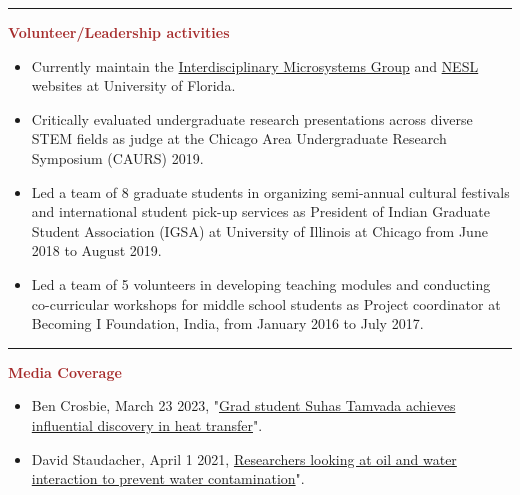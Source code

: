 \documentclass[11pt, letterpaper]{article}
\renewcommand{\headrulewidth}{0pt}
\renewcommand{\footrulewidth}{0pt}
\begin{document}
\vspace{-10pt}
\noindent \rule[2pt]{\textwidth}{0.5pt}
\noindent \textbf{\large \textcolor{Brown}{Volunteer/Leadership activities}}\\
\begin{itemize}[leftmargin=*]
\setlength\itemsep{-2pt}
\vspace{-8pt}
\item Currently maintain the \href{https://www.img.ufl.edu/}{Interdisciplinary Microsystems Group} and \href{https://mae.ufl.edu/neslabs/index.html}{NESL} websites at University of Florida.
\item Critically evaluated undergraduate research presentations across diverse STEM fields as judge at the Chicago Area Undergraduate Research Symposium (CAURS) 2019.
\item Led a team of 8 graduate students in organizing semi-annual cultural festivals and international student pick-up services as President of Indian Graduate Student Association (IGSA) at University of Illinois at Chicago from June 2018 to August 2019.
\item Led a team of 5 volunteers in developing teaching modules and conducting co-curricular workshops for middle school students as Project coordinator at Becoming I Foundation, India, from January 2016 to July 2017.
\end{itemize}
\vspace{-10pt}
\noindent \rule[2pt]{\textwidth}{0.5pt}
\noindent \textbf{\large \textcolor{Brown}{Media Coverage}}\\
\begin{itemize}[leftmargin=*]
\setlength\itemsep{-1pt}
\vspace{-8pt}
\item Ben Crosbie, March 23 2023, "\href{https://mae.ufl.edu/2023/03/23/grad-student-suhas-tamvada-achieves-influential-discovery-in-heat-transfer/}{Grad student Suhas Tamvada achieves influential discovery in heat transfer}".
\item David Staudacher, April 1 2021, \href{https://mie.uic.edu/news-stories/researchers-looking-at-oil-and-water-interaction-to-prevent-water-contamination/}{Researchers looking at oil and water interaction to prevent water contamination}".
\end{itemize}
\thispagestyle{fancy}
\setlength{\voffset}{0in}
\setlength{\headsep}{6pt}
\setlength{\headheight}{50pt}
\footskip 1pt
\renewcommand{\headrulewidth}{0.5pt}
\renewcommand{\footrulewidth}{0pt}
\end{document}
